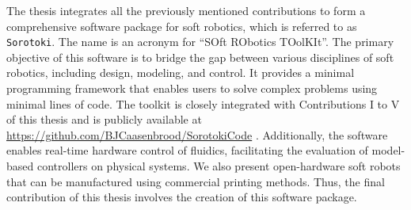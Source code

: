 The thesis integrates all the previously mentioned contributions to form a comprehensive software package for soft robotics, which is referred to as \texttt{Sorotoki}. The name is an acronym for ``SOft RObotics TOolKIt''. The primary objective of this software is to bridge the gap between various disciplines of soft robotics, including design, modeling, and control. It provides a minimal programming framework that enables users to solve complex problems using minimal lines of code. The toolkit is closely integrated with Contributions I to V of this thesis and is publicly available at \url{https://github.com/BJCaasenbrood/SorotokiCode} \cite{SorotokiCode}. Additionally, the software enables real-time hardware control of fluidics, facilitating the evaluation of model-based controllers on physical systems. We also present open-hardware soft robots that can be manufactured using commercial printing methods. Thus, the final contribution of this thesis involves the creation of this software package.

